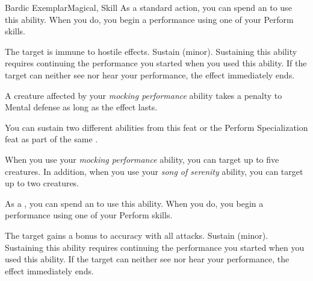 \begin{feat}{Bardic Exemplar}{Magical, Skill}
         As a standard action, you can spend an  to use this ability.
        When you do, you begin a performance using one of your Perform skills.
        \begin{ability}
            \begin{spelltargetinginfo}
            \end{spelltargetinginfo}
            \begin{spelleffects}
                \spelleffect The target is immune to hostile  effects.
                \spelldur Sustain (minor). Sustaining this ability requires continuing the performance you started when you used this ability. If the target can neither see nor hear your performance, the effect immediately ends.
            \end{spelleffects}
        \end{ability}

         A creature affected by your \textit{mocking performance} ability takes a  penalty to Mental defense as long as the effect lasts.

         You can sustain two different  abilities from this feat or the Perform Specialization feat as part of the same .

         When you use your \textit{mocking performance} ability, you can target up to five creatures.
        In addition, when you use your \textit{song of serenity} ability, you can target up to two creatures.

         As a , you can spend an  to use this ability.
        When you do, you begin a performance using one of your Perform skills.
        \begin{ability}
            \begin{spelltargetinginfo}
            \end{spelltargetinginfo}
            \begin{spelleffects}
                \spelleffect The target gains a  bonus to accuracy with all attacks.
                \spelldur Sustain (minor). Sustaining this ability requires continuing the performance you started when you used this ability. If the target can neither see nor hear your performance, the effect immediately ends.
            \end{spelleffects}
        \end{ability}


\end{feat}
